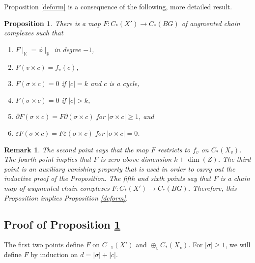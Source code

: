 \documentclass[11pt,letterpaper]{amsart}
\newtheorem{proposition}[theorem]{Proposition}
\newtheorem*{remark}{Remark}
\begin{document}
Proposition \ref{deform} is a consequence of the following, more detailed result. 
\begin{proposition}
\label{assembleprop}
There is a map $F:C_*(X')\rightarrow C_*(BG)$ of augmented %
chain complexes such that 
\begin{enumerate}
\item 
$F\mid_{\mathbb K}=\phi\mid_{\mathbb K}$ in degree $-1$,
\item 
$F(v\times c)=f_v(c)$,
\item
$F(\sigma\times c)=0$ if $|c|=k$ and $c$ is a cycle,
\item 
$F(\sigma\times c)=0$ if $|c|>k$,
\item 
$\partial F(\sigma\times c)=F\partial(\sigma\times c)$ for $|\sigma\times c|\geq 1$, and 
\item 
$\varepsilon F(\sigma\times c)=F\varepsilon(\sigma\times c)$ for $|\sigma\times c|=0$.
\end{enumerate}
\end{proposition}
\begin{remark}
The second point says that the map $F$ restricts to $f_v$ on $C_*(X_v)$. The fourth point implies that $F$ is zero above dimension $k+\dim(Z)$. The third point is an auxiliary vanishing property that is used in order to carry out the inductive proof of the Proposition. The fifth and sixth points say that $F$ is a chain map of augmented chain complexes $F:C_*(X')\rightarrow C_*(BG)$. Therefore, this Proposition implies Proposition \ref{deform}.
\end{remark}
\subsection*{Proof of Proposition \ref{assembleprop}}
The first two points define $F$ on $C_{-1}(X')$ and $\oplus_vC_*(X_v)$. For $|\sigma|\geq 1$, we will define $F$ by induction on $d=|\sigma|+|c|$. 
\end{document}
